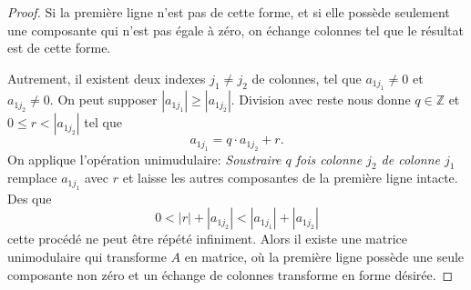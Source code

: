 \begin{proof}

    Si la première ligne n'est pas de cette forme, et si elle possède seulement une
  composante qui n'est pas égale à zéro, on échange colonnes tel que
  le résultat est de cette forme.
  
  Autrement, il existent deux indexes $j_1\neq j_2$ de colonnes, tel
  que $a_{1j_1}\neq 0$ et $a_{1j_2} \neq 0$. On peut supposer
  $|a_{1j_1}| ≥ |a_{1j_2}|$. Division avec reste nous donne $q ∈ℤ$ et
  $0 ≤r < |a_{1j_2}|$ tel que
  \begin{displaymath}
    a_{1j_1} = q ⋅ a_{1j_2} + r. 
  \end{displaymath}
  On applique l'opération unimudulaire: \emph{Soustraire $q$ fois
    colonne $j_2$ de colonne $j_1$} remplace $a_{1j_1}$ avec $r$ et
  laisse les autres composantes de la première ligne intacte.  Des que
    \begin{displaymath}
      0 < |r|+ |a_{1j_2}|<  |a_{1j_{1}}|+ |a_{1j_2}|
    \end{displaymath}
    cette procédé ne peut être répété infiniment. Alors il existe une
    matrice unimodulaire qui transforme $A$ en matrice, où la première
    ligne possède une seule composante non zéro et un échange de
    colonnes transforme en forme désirée.
  \end{proof}

